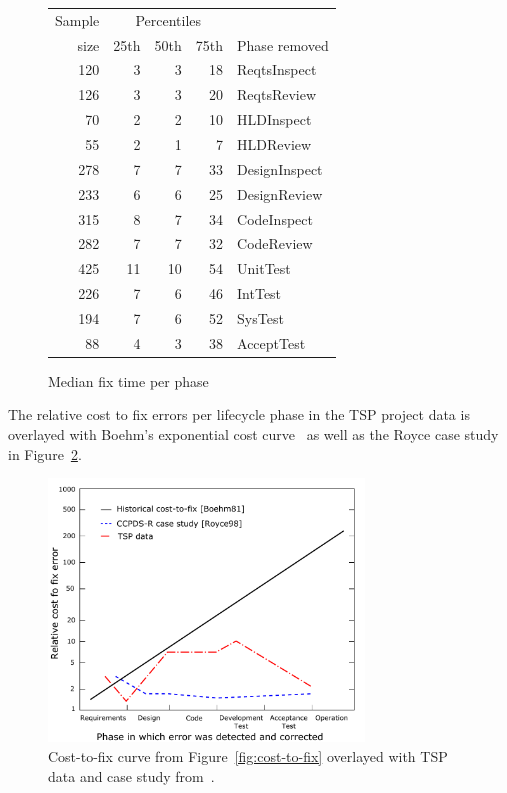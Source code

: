 \documentclass{sig-alternate}
\newcommand{\fig}[1]{Figure~\ref{fig:#1}}
\begin{document}
\begin{figure}[!ht]
\begin{center}
\begin{tabular}{r|rrr|l}
  Sample&\multicolumn{3}{c|}{Percentiles}\\ 
size & 25th & 50th & 75th & Phase removed \\
\hline
120 & 3 & 3 & 18 & ReqtsInspect \\
126 & 3 & 3 & 20 & ReqtsReview \\
70 & 2 & 2 & 10 & HLDInspect \\
 55 &    2 &    1&    7&HLDReview \\

278&    7&    7&   33&DesignInspect \\
233&    6&    6&   25&DesignReview \\

315&    8&    7&   34&CodeInspect \\ 
282&    7&    7&   32&CodeReview\\ 

425&   11&   10&   54&UnitTest \\ 
226&    7&    6&   46&IntTest \\ 
194&    7&    6&   52&SysTest\\ 
 88&    4&    3&   38&AcceptTest\\
\end{tabular}
\end{center}
\caption{Median fix time per phase}
\label{fig:fix-time-per-phase}
\end{figure}


The relative cost to fix errors per lifecycle phase in the TSP project data is overlayed with Boehm's exponential cost curve~\cite{Boehm81} as well as the Royce case study~\cite{Royce98} in \fig{cost-to-fix-tsp}.

\begin{figure}[!ht]
 \includegraphics[width=3.3in]{boehm-overlay.pdf}
 \caption{Cost-to-fix curve from \fig{cost-to-fix} overlayed with TSP data and case study from~\cite{Royce98}.}
 \label{fig:cost-to-fix-tsp}
 \end{figure}
 
\end{document}
